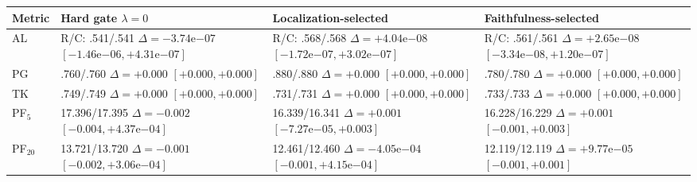 \begin{tabularx}{\linewidth}{>{\raggedright\arraybackslash}p{1.8cm}*{3}{>{\raggedright\arraybackslash}X}}
\toprule
Metric & Hard gate $\lambda=0$ & Localization-selected & Faithfulness-selected \\
\midrule
AL & \shortstack[l]{R/C: .541/.541\\$\Delta=-3.74\mathrm{e}{-07}$\\$[-1.46\mathrm{e}{-06},+4.31\mathrm{e}{-07}]$} & \shortstack[l]{R/C: .568/.568\\$\Delta=+4.04\mathrm{e}{-08}$\\$[-1.72\mathrm{e}{-07},+3.02\mathrm{e}{-07}]$} & \shortstack[l]{R/C: .561/.561\\$\Delta=+2.65\mathrm{e}{-08}$\\$[-3.34\mathrm{e}{-08},+1.20\mathrm{e}{-07}]$} \\
PG & \shortstack[l]{.760/.760\\$\Delta=+0.000$\\$[+0.000,+0.000]$} & \shortstack[l]{.880/.880\\$\Delta=+0.000$\\$[+0.000,+0.000]$} & \shortstack[l]{.780/.780\\$\Delta=+0.000$\\$[+0.000,+0.000]$} \\
TK & \shortstack[l]{.749/.749\\$\Delta=+0.000$\\$[+0.000,+0.000]$} & \shortstack[l]{.731/.731\\$\Delta=+0.000$\\$[+0.000,+0.000]$} & \shortstack[l]{.733/.733\\$\Delta=+0.000$\\$[+0.000,+0.000]$} \\
PF$_5$ & \shortstack[l]{17.396/17.395\\$\Delta=-0.002$\\$[-0.004,+4.37\mathrm{e}{-04}]$} & \shortstack[l]{16.339/16.341\\$\Delta=+0.001$\\$[-7.27\mathrm{e}{-05},+0.003]$} & \shortstack[l]{16.228/16.229\\$\Delta=+0.001$\\$[-0.001,+0.003]$} \\
PF$_{20}$ & \shortstack[l]{13.721/13.720\\$\Delta=-0.001$\\$[-0.002,+3.06\mathrm{e}{-04}]$} & \shortstack[l]{12.461/12.460\\$\Delta=-4.05\mathrm{e}{-04}$\\$[-0.001,+4.15\mathrm{e}{-04}]$} & \shortstack[l]{12.119/12.119\\$\Delta=+9.77\mathrm{e}{-05}$\\$[-0.001,+0.001]$} \\

\end{tabularx}
